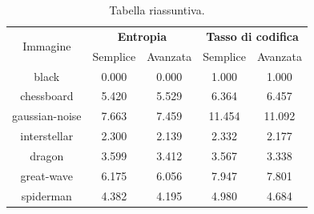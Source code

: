 \begin{table}[h]
    \centering
    \renewcommand{\arraystretch}{1.5}
    \begin{tabular}{| c | c c | c c |}
        \hline
        \multirow{2}{*}{Immagine} & \multicolumn{2}{c|}{\textbf{Entropia}} & \multicolumn{2}{c|}{\textbf{Tasso di codifica}} \\
        & Semplice & Avanzata & Semplice & Avanzata \\\hline\hline

        black & 0.000 & 0.000 & 1.000 & 1.000 \\
        
        chessboard & 5.420 & 5.529 & 6.364 & 6.457 \\
        
        gaussian-noise & 7.663 & 7.459 & 11.454 & 11.092 \\
        
        interstellar & 2.300 & 2.139 & 2.332 & 2.177 \\
        
        dragon & 3.599 & 3.412 & 3.567 & 3.338 \\
        
        great-wave & 6.175 & 6.056 & 7.947 & 7.801 \\
        
        spiderman & 4.382 & 4.195 & 4.980 & 4.684\\
        \hline
    \end{tabular}
    \caption{Tabella riassuntiva.}
    \label{tab:overall-conclusions}
    \renewcommand{\arraystretch}{1}
\end{table}



